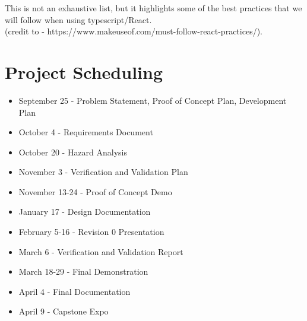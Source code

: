 \documentclass{article}
\begin{document}
This is not an exhaustive list, but it highlights some of the best practices that we will follow when using typescript/React.\\
(credit to - https://www.makeuseof.com/must-follow-react-practices/).

\section{Project Scheduling}

\begin{itemize}
	\item September 25 - Problem Statement, Proof of Concept Plan, Development Plan
	\item October 4 - Requirements Document
	\item October 20 - Hazard Analysis
	\item November 3 - Verification and Validation Plan
	\item November 13-24 - Proof of Concept Demo
	\item January 17 - Design Documentation
	\item February 5-16 - Revision 0 Presentation
	\item March 6 - Verification and Validation Report
	\item March 18-29 - Final Demonstration
	\item April 4 - Final Documentation
	\item April 9 - Capstone Expo
\end {itemize}
\end{document}
